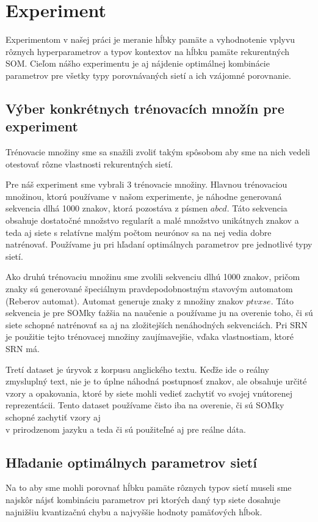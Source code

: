 \chapter{Experiment}

Experimentom v našej práci je meranie hĺbky pamäte a vyhodnotenie vplyvu rôznych
hyperparametrov a typov kontextov na hĺbku pamäte rekurentných SOM.
Cieľom nášho experimentu je aj nájdenie 
optimálnej kombinácie parametrov pre všetky typy porovnávaných sietí a ich vzájomné porovnanie.

\section{Výber konkrétnych trénovacích množín pre experiment}
Trénovacie množiny sme sa snažili zvoliť
takým spôsobom aby sme na nich vedeli otestovať rôzne vlastnosti rekurentných sietí.

Pre náš experiment sme vybrali 3 trénovacie množiny.
Hlavnou trénovaciou množinou, ktorú používame v našom experimente, je náhodne generovaná 
sekvencia dlhá 1000 znakov, ktorá pozostáva z písmen $abcd$.
Táto sekvencia obsahuje dostatočné množstvo regularít a malé množstvo unikátnych znakov a teda
aj siete s relatívne malým počtom neurónov sa na nej vedia dobre natrénovať.
Používame ju pri hľadaní optimálnych parametrov pre jednotlivé typy sietí.

Ako druhú trénovaciu množinu sme zvolili sekvenciu dlhú 1000 znakov, pričom znaky sú generované
špeciálnym pravdepodobnostným stavovým automatom (Reberov automat). Automat generuje znaky z množiny znakov $ptvxse$.
Táto sekvencia je pre SOMky ťažšia na naučenie a používame ju na overenie toho, či sú siete schopné natrénovať sa aj
na zložitejších nenáhodných sekvenciách. Pri SRN je použitie tejto trénovacej množiny zaujímavejšie,
vďaka vlastnostiam, ktoré SRN má.

Tretí dataset je úryvok z korpusu anglického textu.
Keďže ide o reálny zmysluplný text, nie je to úplne náhodná postupnosť znakov, ale obsahuje určité vzory a opakovania, ktoré by siete mohli vedieť zachytiť
vo svojej vnútorenej reprezentácii.
Tento dataset používame čisto iba na overenie, či 
sú SOMky schopné zachytiť vzory aj \\ v prirodzenom jazyku a teda či sú použiteľné aj pre 
reálne dáta.

\section{Hľadanie optimálnych parametrov sietí}
Na to aby sme mohli porovnať hĺbku pamäte rôznych typov sietí museli sme najskôr
nájsť kombináciu parametrov pri ktorých daný typ siete dosahuje najnižšiu kvantizačnú chybu a 
najvyššie hodnoty pamäťových hĺbok. 

